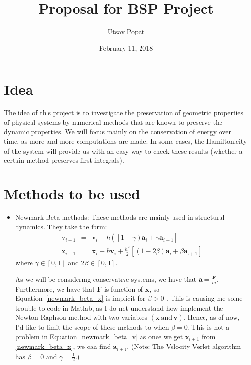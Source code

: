 \documentclass[a4paper, 12pt]{article}
\title{Proposal for BSP Project}
\author{Utsav Popat}
\date{February 11, 2018}
\renewcommand{\vec}[1]{\mathbf{#1}}
\begin{document}
	\maketitle
	\section{Idea}
The idea of this project is to investigate the preservation of geometric properties of physical systems by numerical methods that are known to preserve the dynamic properties. We will focus mainly on the conservation of energy over time, as more and more computations are made. In some cases, the Hamiltonicity of the system will provide us with an easy way to check these results (whether a certain method preserves first integrals).

	\section{Methods to be used}
\begin{itemize}
	\item Newmark-Beta methods: \newline
These methods are mainly used in structural dynamics. They take the form:
\begin{eqnarray}
	\vec{v}_{i+1} & = & \vec{v}_{i} + h\left( \left[1-\gamma \right)\vec{a}_{i} + \gamma \vec{a}_{i+1}\right] \label{newmark_beta_v}\\
	\vec{x}_{i+1} & = & \vec{x}_{i} + h\vec{v}_{i} + \frac{h^2}{2}\left[ \left(1-2\beta \right)\vec{a}_{i} + \beta \vec{a}_{i+1}\right] \label{newmark_beta_x}
\end{eqnarray} where $\gamma \in \left[0, 1 \right]$ and $2\beta \in \left[0, 1 \right]$.

As we will be considering conservative systems, we have that $ \vec{a}  = \frac{\vec{F}}{m} $. Furthermore, we have that $\vec{F}$ is function of $\vec{x}$, so Equation~\ref{newmark_beta_x} is implicit for $ \beta > 0 $ . This is causing me some trouble to code in Matlab, as I do not understand how implement the Newton-Raphson method with two variables $\left(\vec{x} ~\mbox{and}~ \vec{v}\right)$. Hence, as of now, I'd like to limit the scope of these methods to when $\beta = 0$. This is not a problem in Equation~\ref{newmark_beta_v} as once we get $\vec{x}_{i+1}$ from \ref{newmark_beta_x}, we can find $\vec{a}_{i+1}$. (Note: The Velocity Verlet \cite{Verlet1967} algorithm has $\beta = 0$ and $\gamma = \frac{1}{2} $.) 
\end{itemize}
\end{document}

